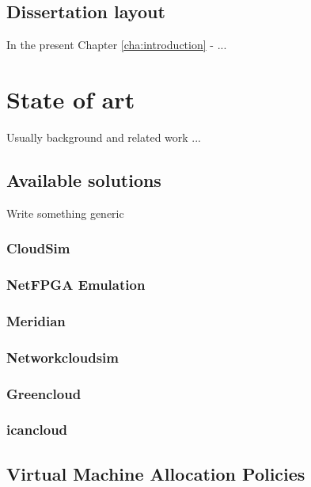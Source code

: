 \documentclass[12pt,english]{book}
\begin{document}
\section{Dissertation layout}

In the present Chapter \ref{cha:introduction} - ...

\chapter{State of art \label{cha:stateofart} }

Usually background and related work ...

\section{Available solutions}

Write something generic

\subsection{CloudSim}

\subsection{NetFPGA Emulation}

\subsection{Meridian}

\subsection{Networkcloudsim}

\subsection{Greencloud}

\subsection{icancloud}

\newpage
\section{Virtual Machine Allocation Policies}

\newpage
\end{document}
